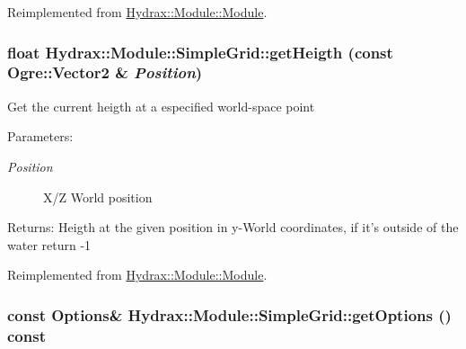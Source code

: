 Reimplemented from \hyperlink{class_hydrax_1_1_module_1_1_module_4b696328c3fc1496f757e929f44f3258}{Hydrax::Module::Module}.\hypertarget{class_hydrax_1_1_module_1_1_simple_grid_9a9e5bba632f0317c82370fa433559ac}{
\subsubsection[{getHeigth}]{\setlength{\rightskip}{0pt plus 5cm}float Hydrax::Module::SimpleGrid::getHeigth (const Ogre::Vector2 \& {\em Position})}}
\label{class_hydrax_1_1_module_1_1_simple_grid_9a9e5bba632f0317c82370fa433559ac}


Get the current heigth at a especified world-space point \begin{Desc}
\item[Parameters:]
\begin{description}
\item[{\em Position}]X/Z World position \end{description}
\end{Desc}
\begin{Desc}
\item[Returns:]Heigth at the given position in y-World coordinates, if it's outside of the water return -1 \end{Desc}


Reimplemented from \hyperlink{class_hydrax_1_1_module_1_1_module_c61f89589d3b1bc7256731ddb7af7d0b}{Hydrax::Module::Module}.\hypertarget{class_hydrax_1_1_module_1_1_simple_grid_bcc8d6a849224e8558162adb8f3baf69}{
\subsubsection[{getOptions}]{\setlength{\rightskip}{0pt plus 5cm}const {\bf Options}\& Hydrax::Module::SimpleGrid::getOptions () const}}
\label{class_hydrax_1_1_module_1_1_simple_grid_bcc8d6a849224e8558162adb8f3baf69}


